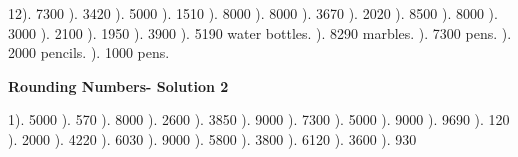 \documentclass{article}%
\begin{document}
12). 7300%
). 3420%
). 5000%
). 1510%
). 8000%
). 8000%
). 3670%
). 2020%
). 8500%
). 8000%
). 3000%
). 2100%
). 1950%
). 3900%
). 5190 water bottles.%
). 8290 marbles.%
). 7300 pens.%
). 2000 pencils.%
). 1000 pens.%
\newline%
\newpage%
\large%
\begin{center}%
\textbf{Rounding Numbers- Solution 2}%
\newline%
\end{center} \normalsize%
1). 5000%
). 570%
). 8000%
). 2600%
). 3850%
). 9000%
). 7300%
). 5000%
). 9000%
). 9690%
). 120%
). 2000%
). 4220%
). 6030%
). 9000%
). 5800%
). 3800%
). 6120%
). 3600%
). 930%
\newline%
\end{document}
